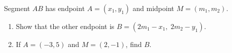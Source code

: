 Segment $AB$ has endpoint $A=(x_1,y_1)$ and midpoint $M=(m_1,m_2)$.
\begin{enumerate}
\item[(a)] Show that the other endpoint is $B=(2m_1-x_1,\;2m_2-y_1)$.
\item[(b)] If $A=(-3,5)$ and $M=(2,-1)$, find $B$.
\end{enumerate}
